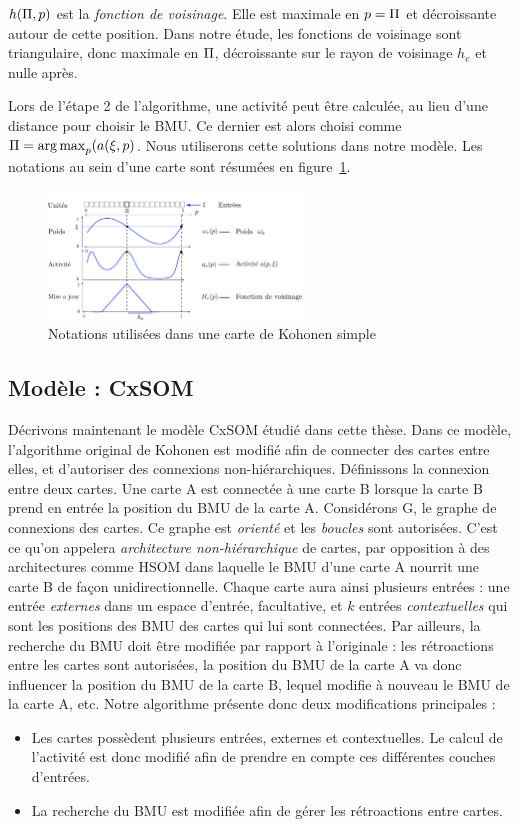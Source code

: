 $h(\Pi,p)$ est la \emph{fonction de voisinage}. Elle est maximale en $p = \Pi$ et décroissante autour de cette position. Dans notre étude, les fonctions de voisinage sont triangulaire, donc maximale en $\Pi$, décroissante sur le rayon de voisinage $h_e$ et nulle après.

Lors de l'étape 2 de l'algorithme, une activité peut être calculée, au lieu d'une distance pour choisir le BMU. Ce dernier est alors choisi comme $\Pi = \operatorname*{arg\,max}_p (a(\xi,p)$. Nous utiliserons cette solutions dans notre modèle. Les notations au sein d'une carte sont résumées en figure~\ref{fig:one_map_not}.

\begin{figure}
\centering
\includegraphics[width=0.6\textwidth]{one_map_one_layer.pdf}
\caption{Notations utilisées dans une carte de Kohonen simple}
\label{fig:one_map_not}
\end{figure}

\subsection{Modèle : CxSOM}

Décrivons maintenant le modèle CxSOM étudié dans cette thèse. Dans ce modèle, l'algorithme original de Kohonen est modifié afin de connecter des cartes entre elles, et d'autoriser des connexions non-hiérarchiques.
Définissons la connexion entre deux cartes. Une carte A est connectée à une carte B lorsque la carte B prend en entrée la position du BMU de la carte A. 
Considérons G, le graphe de connexions des cartes. Ce graphe est \emph{orienté} et les \emph{boucles} sont autorisées. C'est ce qu'on appelera \emph{architecture non-hiérarchique} de cartes, par opposition à des architectures comme HSOM dans laquelle le BMU d'une carte A nourrit une carte B de façon unidirectionnelle. 
Chaque carte aura ainsi plusieurs entrées : une entrée \emph{externes} dans un espace d'entrée, facultative, et $k$ entrées \emph{contextuelles} qui sont les positions des BMU des cartes qui lui sont connectées. Par ailleurs, la recherche du BMU doit être modifiée par rapport à l'originale : les rétroactions entre les cartes sont autorisées, la position du BMU de la carte A va donc influencer la position du BMU de la carte B, lequel modifie à nouveau le BMU de la carte A, etc. 
Notre algorithme présente donc deux modifications principales : 
\begin{itemize}
\item Les cartes possèdent plusieurs entrées, externes et contextuelles. Le calcul de l'activité est donc modifié afin de prendre en compte ces différentes couches d'entrées.
\item La recherche du BMU est modifiée afin de gérer les rétroactions entre cartes.
\end{itemize}

